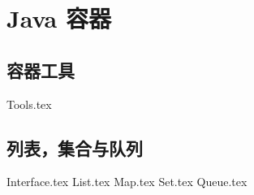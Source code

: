 \documentclass{PionpillNote-book}
\begin{document}
\part{Java 容器}
\chapter{容器工具}
{Tools.tex}
\chapter{列表，集合与队列}
{Interface.tex}
{List.tex}
{Map.tex}
{Set.tex}
{Queue.tex}
\end{document}
